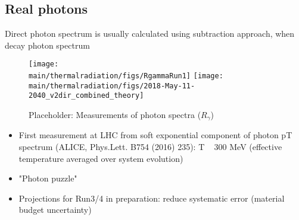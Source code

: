 \subsection{Real photons}

Direct photon spectrum is usually calculated using subtraction approach, when decay photon spectrum 



\begin{figure}[htb]
\centering
\texttt{[image: \\main/thermalradiation/figs/RgammaRun1]}
\texttt{[image: \\main/thermalradiation/figs/2018-May-11-2040\_v2dir\_combined\_theory]}
\caption{Placeholder: Measurements of photon spectra ($R_{\gamma}$)}
\label{fig:RealPhotons}
\end{figure}


\begin{itemize}
\item First measurement at LHC from soft exponential component of photon pT spectrum (ALICE, Phys.Lett. B754 (2016) 235): T ~ 300 MeV (effective temperature averaged over system evolution)
\item "Photon puzzle"
\item Projections for Run3/4 in preparation: reduce systematic error (material budget uncertainty)
\end{itemize}
